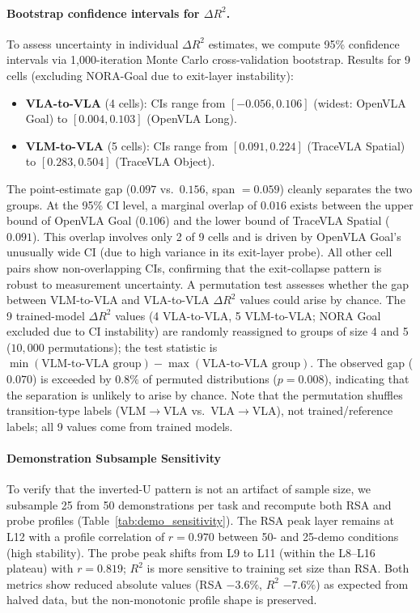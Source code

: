 \paragraph{Bootstrap confidence intervals for $\Delta R^2$.}
To assess uncertainty in individual $\Delta R^2$ estimates, we compute 95\% confidence intervals via 1{,}000-iteration Monte Carlo cross-validation bootstrap.
Results for 9 cells (excluding NORA-Goal due to exit-layer instability):
\begin{itemize}[nosep]
\item \textbf{VLA-to-VLA} (4 cells): CIs range from $[-0.056, 0.106]$ (widest: OpenVLA Goal) to $[0.004, 0.103]$ (OpenVLA Long).
\item \textbf{VLM-to-VLA} (5 cells): CIs range from $[0.091, 0.224]$ (TraceVLA Spatial) to $[0.283, 0.504]$ (TraceVLA Object).
\end{itemize}
The point-estimate gap ($0.097$ vs.\ $0.156$, span $= 0.059$) cleanly separates the two groups.
At the 95\% CI level, a marginal overlap of $0.016$ exists between the upper bound of OpenVLA Goal ($0.106$) and the lower bound of TraceVLA Spatial ($0.091$).
This overlap involves only 2 of 9 cells and is driven by OpenVLA Goal's unusually wide CI (due to high variance in its exit-layer probe).
All other cell pairs show non-overlapping CIs, confirming that the exit-collapse pattern is robust to measurement uncertainty.
A permutation test assesses whether the gap between VLM-to-VLA and VLA-to-VLA $\Delta R^2$ values could arise by chance.
The 9 trained-model $\Delta R^2$ values (4 VLA-to-VLA, 5 VLM-to-VLA; NORA Goal excluded due to CI instability) are randomly reassigned to groups of size 4 and 5 ($10{,}000$ permutations); the test statistic is $\min(\text{VLM-to-VLA group}) - \max(\text{VLA-to-VLA group})$.
The observed gap ($0.070$) is exceeded by $0.8\%$ of permuted distributions ($p = 0.008$), indicating that the separation is unlikely to arise by chance.
Note that the permutation shuffles transition-type labels (VLM$\to$VLA vs.\ VLA$\to$VLA), not trained/reference labels; all 9 values come from trained models.

\paragraph{Demonstration Subsample Sensitivity}
To verify that the inverted-U pattern is not an artifact of sample size, we subsample 25 from 50 demonstrations per task and recompute both RSA and probe profiles (Table~\ref{tab:demo_sensitivity}).
The RSA peak layer remains at L12 with a profile correlation of $r = 0.970$ between 50- and 25-demo conditions (high stability).
The probe peak shifts from L9 to L11 (within the L8--L16 plateau) with $r = 0.819$; $R^2$ is more sensitive to training set size than RSA.
Both metrics show reduced absolute values (RSA $-3.6\%$, $R^2$ $-7.6\%$) as expected from halved data, but the non-monotonic profile shape is preserved.

